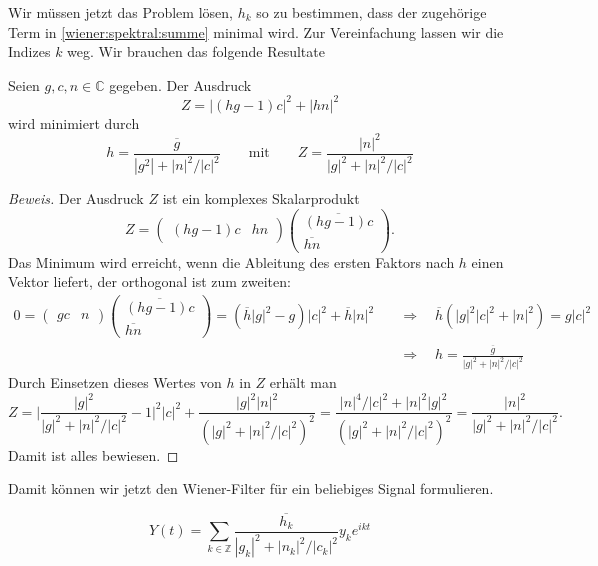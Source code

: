 Wir müssen jetzt das Problem lösen, $h_k$ so zu bestimmen, dass
der zugehörige Term in \eqref{wiener:spektral:summe} minimal wird.
Zur Vereinfachung lassen wir die Indizes $k$ weg.
Wir brauchen das folgende Resultate

\begin{hilfssatz}
Seien $g,c,n\in\mathbb C$ gegeben.
Der Ausdruck
\[
Z = |(hg-1)c|^2 + |hn|^2
\]
wird minimiert durch 
\[
h = \frac{\overline{g}}{|g^2|+|n|^2/|c|^2}
\qquad\text{mit}\qquad
Z = \frac{|n|^2}{|g|^2 + |n|^2/|c|^2}
\]
\end{hilfssatz}

\begin{proof}[Beweis]
Der Ausdruck $Z$ ist ein komplexes Skalarprodukt
\[
Z
=
\begin{pmatrix}
(hg-1)c&hn
\end{pmatrix}
\begin{pmatrix}
\overline{(hg-1)c}\\\overline{hn}
\end{pmatrix}.
\]
Das Minimum wird erreicht, wenn die Ableitung des ersten Faktors nach
$h$ einen Vektor liefert, der orthogonal ist zum zweiten:
\begin{align*}
0
=
\begin{pmatrix}
gc&n
\end{pmatrix}
\begin{pmatrix}
\overline{(hg-1)c}\\\overline{hn}
\end{pmatrix}
=
(\overline{h} |g|^2 - g )|c|^2
+
\overline{h} |n|^2
\quad&\Rightarrow\quad
\overline{h}(|g|^2|c|^2+|n|^2)=g|c|^2
\\
\quad&\Rightarrow\quad
h=\frac{\overline{g}}{|g|^2 + |n|^2/|c|^2}
\end{align*}
Durch Einsetzen dieses Wertes von $h$ in $Z$ erhält man
\[
Z
=
\biggl|
\frac{|g|^2}{|g|^2+|n|^2/|c|^2}
-1
\biggr|^2 |c|^2
+
\frac{|g|^2|n|^2}{(|g|^2+|n|^2/|c|^2)^2}
=
\frac{|n|^4/|c|^2 + |n|^2 |g|^2}{(|g|^2+|n|^2/|c|^2)^2}
=
\frac{|n|^2}{|g|^2+|n|^2/ |c|^2}.
\]
Damit ist alles bewiesen.
\end{proof}

Damit können wir jetzt den Wiener-Filter für ein beliebiges Signal
formulieren.

\begin{satz}
\[
Y(t)
=
\sum_{k\in\mathbb Z}
\frac{\overline{h_k}}{|g_k|^2+|n_k|^2/|c_k|^2} y_k e^{ikt}
\]
\end{satz}

%
%
